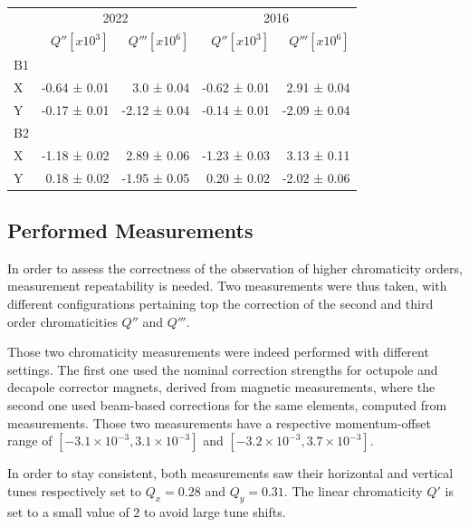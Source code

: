 \begin{table}[H]
    \centering
    \begin{tabular}{|l||rr|rr|}
        \hline
        \multicolumn{1}{|c||}{} & \multicolumn{2}{c|}{2022}       &  \multicolumn{2}{c|}{2016} \\
            & $Q'' [x10^3]$ & $Q''' [x10^6]$ & $Q'' [x10^3]$ & $Q''' [x10^6]$\\
        \hline \hline
        B1 &&&& \\
        X & -0.64 ± 0.01 &   3.0 ± 0.04   & -0.62 ± 0.01 &  2.91 ± 0.04 \\
        Y & -0.17 ± 0.01 & -2.12 ± 0.04   & -0.14 ± 0.01 & -2.09 ± 0.04 \\
        \hline
        B2 &&&& \\
        X & -1.18 ± 0.02 &  2.89 ± 0.06   & -1.23 ± 0.03 &  3.13 ± 0.11 \\
        Y &  0.18 ± 0.02 & -1.95 ± 0.05   &  0.20 ± 0.02 & -2.02 ± 0.06 \\
        \hline
    \end{tabular}
    \label{table:very_high_orders:bare_chroma_2016}
    \caption{}
\end{table}



\subsection{Performed Measurements}

In order to assess the correctness of the observation of higher chromaticity orders, measurement
repeatability is needed. Two measurements were thus taken, with different configurations pertaining
top the correction of the second and third order chromaticities $Q''$ and $Q'''$.

Those two chromaticity measurements were indeed performed with different settings. The first one
used the nominal correction strengths for octupole and decapole corrector magnets, derived from
magnetic measurements, where the second one used beam-based corrections for the same elements,
computed from measurements. 
Those two measurements have a respective momentum-offset range of $[-3.1 \times 10^{-3}, 3.1 \times
10^{-3}]$ and $[-3.2 \times 10^{-3}, 3.7 \times 10^{-3}]$.

In order to stay consistent, both measurements saw their horizontal and vertical tunes respectively
set to $Q_x = 0.28$ and $Q_y = 0.31$. The linear chromaticity $Q'$ is set to a small value of $2$ to
avoid large tune shifts.


